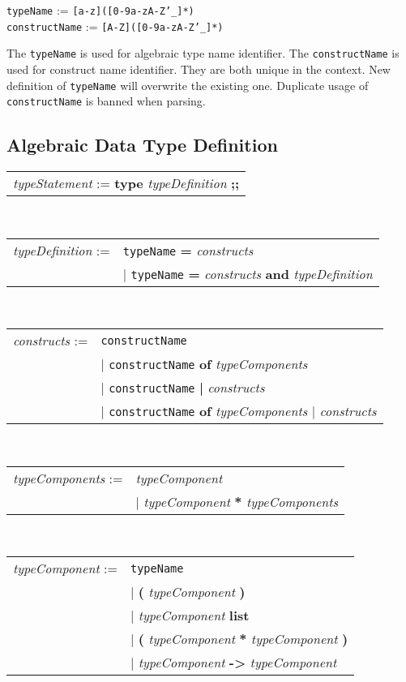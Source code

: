 \documentclass[a4paper,12pt]{article}
\begin{document}
	\texttt{typeName} := \texttt{[a-z]([0-9a-zA-Z'\_]*)}\\
	\texttt{constructName} := \texttt{[A-Z]([0-9a-zA-Z'\_]*)}
	
	The \texttt{typeName} is used for algebraic type name identifier. The \texttt{constructName} is used for construct name identifier. They are both unique in the context. New definition of \texttt{typeName} will overwrite the existing one. Duplicate usage of \texttt{constructName} is banned when parsing.

	\subsection{Algebraic Data Type Definition}
		{
			\begin{tabular}{l}
				\textit{typeStatement} := \textbf{type} \textit{typeDefinition} \textbf{;;} \\
			\end{tabular}\\
			\begin{tabular}{ll}
				\textit{typeDefinition} := & \texttt{typeName} \textbf{=} \textit{constructs}\\
				& $\vert$ \texttt{typeName} \textbf{=} \textit{constructs} \textbf{and} \textit{typeDefinition} \\
			\end{tabular}\\
			\begin{tabular}{ll}
				\textit{constructs} := & \texttt{constructName}\\
				& $\vert$ \texttt{constructName} \textbf{of} \textit{typeComponents}\\
				& $\vert$ \texttt{constructName} \textbf{|} \textit{constructs}\\
				& $\vert$ \texttt{constructName} \textbf{of} \textit{typeComponents} $\mathbf{|}$ \textit{constructs}
			\end{tabular}\\
			\begin{tabular}{ll}
			\textit{typeComponents} := & \textit{typeComponent}\\
			& $\vert$ \textit{typeComponent} \textbf{*} \textit{typeComponents}
			\end{tabular}\\
			\begin{tabular}{ll}
			\textit{typeComponent} := & \texttt{typeName}\\
			& $\vert$ \textbf{(} \textit{typeComponent} \textbf{)}\\
			& $\vert$ \textit{typeComponent} \textbf{list} \\
			& $\vert$ \textbf{(} \textit{typeComponent} \textbf{*} \textit{typeComponent} \textbf{)} \\
			& $\vert$ \textit{typeComponent} \textbf{->} \textit{typeComponent}
			\end{tabular}\\
		}
	
\end{document}
